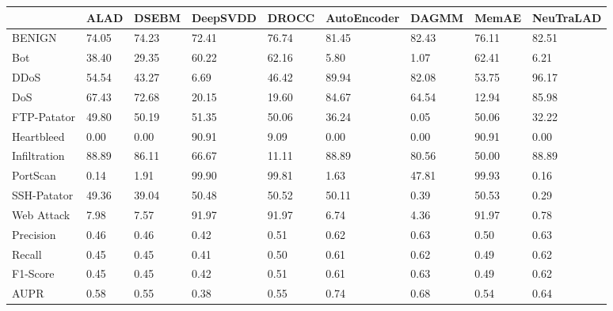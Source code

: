 \begin{tabular}{lllllllll}
\toprule
{} &   ALAD &  DSEBM & DeepSVDD &  DROCC & AutoEncoder &  DAGMM &  MemAE & NeuTraLAD \\
\midrule
BENIGN       &  74.05 &  74.23 &    72.41 &  76.74 &       81.45 &  82.43 &  76.11 &     82.51 \\
Bot          &  38.40 &  29.35 &    60.22 &  62.16 &        5.80 &   1.07 &  62.41 &      6.21 \\
DDoS         &  54.54 &  43.27 &     6.69 &  46.42 &       89.94 &  82.08 &  53.75 &     96.17 \\
DoS          &  67.43 &  72.68 &    20.15 &  19.60 &       84.67 &  64.54 &  12.94 &     85.98 \\
FTP-Patator  &  49.80 &  50.19 &    51.35 &  50.06 &       36.24 &   0.05 &  50.06 &     32.22 \\
Heartbleed   &   0.00 &   0.00 &    90.91 &   9.09 &        0.00 &   0.00 &  90.91 &      0.00 \\
Infiltration &  88.89 &  86.11 &    66.67 &  11.11 &       88.89 &  80.56 &  50.00 &     88.89 \\
PortScan     &   0.14 &   1.91 &    99.90 &  99.81 &        1.63 &  47.81 &  99.93 &      0.16 \\
SSH-Patator  &  49.36 &  39.04 &    50.48 &  50.52 &       50.11 &   0.39 &  50.53 &      0.29 \\
Web Attack   &   7.98 &   7.57 &    91.97 &  91.97 &        6.74 &   4.36 &  91.97 &      0.78 \\
Precision    &   0.46 &   0.46 &     0.42 &   0.51 &        0.62 &   0.63 &   0.50 &      0.63 \\
Recall       &   0.45 &   0.45 &     0.41 &   0.50 &        0.61 &   0.62 &   0.49 &      0.62 \\
F1-Score     &   0.45 &   0.45 &     0.42 &   0.51 &        0.61 &   0.63 &   0.49 &      0.62 \\
AUPR         &   0.58 &   0.55 &     0.38 &   0.55 &        0.74 &   0.68 &   0.54 &      0.64 \\
\bottomrule
\end{tabular}
